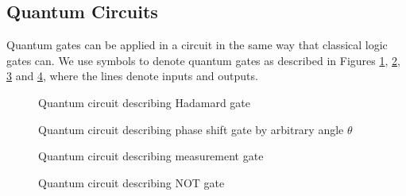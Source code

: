 \subsection{Quantum Circuits}
Quantum gates can be applied in a circuit in the same way that classical logic gates can. We use symbols to denote quantum gates as described in Figures \ref{fig:hadamardGate}, \ref{fig:phaseshiftGate}, \ref{fig:measurementGate} and \ref{fig:notGate}, where the lines denote inputs and outputs.
\begin{figure}[!htb]
\centering
\resizebox{2cm}{!}{}
\caption{Quantum circuit describing Hadamard gate}
\label{fig:hadamardGate}
\end{figure}\begin{figure}[!htb]
\centering
\resizebox{2cm}{!}{}
\caption{Quantum circuit describing phase shift gate by arbitrary angle $\theta$}
\label{fig:phaseshiftGate}
\end{figure}\begin{figure}[!htb]
\centering
\resizebox{2cm}{!}{}
\caption{Quantum circuit describing measurement gate}
\label{fig:measurementGate}
\end{figure}\begin{figure}[!htb]
\centering
\resizebox{2cm}{!}{}
\caption{Quantum circuit describing NOT gate}
\label{fig:notGate}
\end{figure}
